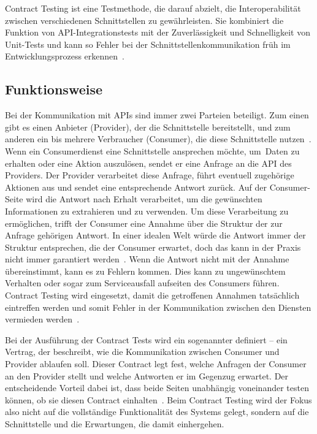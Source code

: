 Contract Testing ist eine Testmethode, die darauf abzielt, die Interoperabilität zwischen verschiedenen Schnittstellen zu gewährleisten.
Sie kombiniert die Funktion von \gls{API}-\-Integrations\-tests mit der Zuverlässigkeit und Schnelligkeit von Unit-Tests und kann so Fehler bei der Schnittstellenkommunikation früh im Entwicklungsprozess erkennen~\cite{cruzContractTestingAction2025}.

\subsection{Funktionsweise}\label{subsec:foundation_contracttesting_concept}

Bei der Kommunikation mit \glspl{API} sind immer zwei Parteien beteiligt.
Zum einen gibt es einen Anbieter (Provider), der die Schnittstelle bereitstellt, und zum anderen ein bis mehrere Verbraucher (Consumer), die diese Schnittstelle nutzen~\cite{newmanBuildingMicroservices2021}.
Wenn ein Consumerdienst eine Schnittstelle ansprechen möchte, um~\zB Daten zu erhalten oder eine Aktion auszulösen, sendet er eine Anfrage an die \gls{API} des Providers.
Der Provider verarbeitet diese Anfrage, führt eventuell zugehörige Aktionen aus und sendet eine entsprechende Antwort zurück.
Auf der Consumer-Seite wird die Antwort nach Erhalt verarbeitet, um die gewünschten Informationen zu extrahieren und zu verwenden.
Um diese Verarbeitung zu ermöglichen, trifft der Consumer eine Annahme über die Struktur der zur Anfrage gehörigen Antwort.
In einer idealen Welt würde die Antwort immer der Struktur entsprechen, die der Consumer erwartet, doch das kann in der Praxis nicht immer garantiert werden~\cite{waseemDesignMonitoringTesting2021}.
Wenn die Antwort nicht mit der Annahme übereinstimmt, kann es zu Fehlern kommen.
Dies kann zu ungewünschtem Verhalten oder sogar zum Serviceausfall aufseiten des Consumers führen.
Contract Testing wird eingesetzt, damit die getroffenen Annahmen tatsächlich eintreffen werden und somit Fehler in der Kommunikation zwischen den Diensten vermieden werden~\cite{cruzContractTestingAction2025}.

Bei der Ausführung der Contract Tests wird ein sogenannter  definiert – ein Vertrag, der beschreibt, wie die Kommunikation zwischen Consumer und Provider ablaufen soll.
Dieser Contract legt fest, welche Anfragen der Consumer an den Provider stellt und welche Antworten er im Gegenzug erwartet.
Der entscheidende Vorteil dabei ist, dass beide Seiten unabhängig voneinander testen können, ob sie diesen Contract einhalten~\cite{newmanBuildingMicroservices2021}.
Beim Contract Testing wird der Fokus also nicht auf die vollständige Funktionalität des Systems gelegt, sondern auf die Schnittstelle und die Erwartungen, die damit einhergehen.

